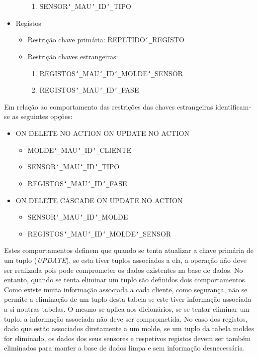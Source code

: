 \documentclass[11pt,twoside,a4paper]{report}
\begin{document}
\begin{itemize}[noitemsep]
\begin{itemize}[noitemsep]
\begin{enumerate}
			\item SENSOR\texttt{\char`_}MAU\texttt{\char`_}ID\texttt{\char`_}TIPO
		\end{enumerate}
	\end{itemize}
	\item Registos
	\begin{itemize}[noitemsep]
		\item Restrição chave primária: REPETIDO\texttt{\char`_}REGISTO
		\item Restrição chaves estrangeiras:
		\begin{enumerate}
			\item REGISTOS\texttt{\char`_}MAU\texttt{\char`_}ID\texttt{\char`_}MOLDE\texttt{\char`_}SENSOR
			\item REGISTOS\texttt{\char`_}MAU\texttt{\char`_}ID\texttt{\char`_}FASE
		\end{enumerate}
	\end{itemize}
\end{itemize}
Em relação ao comportamento das restrições das chaves estrangeiras identificam-se as seguintes opções:
\begin{itemize}
	\item ON DELETE NO ACTION ON UPDATE NO ACTION
	\begin{itemize}
		\item MOLDE\texttt{\char`_}MAU\texttt{\char`_}ID\texttt{\char`_}CLIENTE
		\item SENSOR\texttt{\char`_}MAU\texttt{\char`_}ID\texttt{\char`_}TIPO
		\item REGISTOS\texttt{\char`_}MAU\texttt{\char`_}ID\texttt{\char`_}FASE
	\end{itemize}
	\item ON DELETE CASCADE ON UPDATE NO ACTION
	\begin{itemize}
		\item SENSOR\texttt{\char`_}MAU\texttt{\char`_}ID\texttt{\char`_}MOLDE
		\item REGISTOS\texttt{\char`_}MAU\texttt{\char`_}ID\texttt{\char`_}MOLDE\texttt{\char`_}SENSOR
	\end{itemize}
\end{itemize}
Estes comportamentos definem que quando se tenta atualizar a chave primária de um tuplo (\textit{UPDATE}), se esta tiver tuplos associados a ela, a operação não deve ser realizada pois pode comprometer os dados existentes na base de dados. No entanto, quando se tenta eliminar um tuplo são definidos dois comportamentos. Como existe muita informação associada a cada cliente, como segurança, não se permite a eliminação de um tuplo desta tabela se este tiver informação associada a si noutras tabelas. O mesmo se aplica aos dicionários, se se tentar eliminar um tuplo, a informação associada não deve ser comprometida. No caso dos registos, dado que estão associados diretamente a um molde, se um tuplo da tabela moldes for eliminado, os dados dos seus sensores e respetivos registos devem ser também eliminados para manter a base de dados limpa e sem informação desnecessária.\par 
\end{document}
